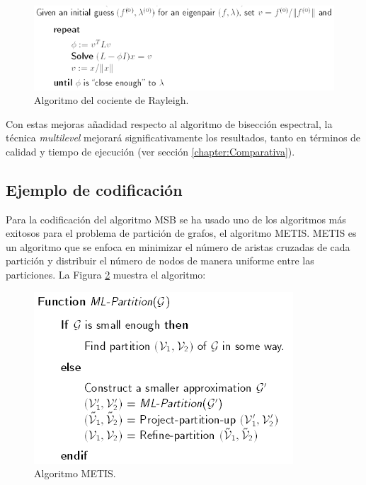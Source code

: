 \vspace{-4mm}
\begin{figure}[h]
	\centering
	\includegraphics[scale=0.8]{Figures/rayleigh}
	\vspace{2mm}
	\caption{Algoritmo del cociente de Rayleigh.}
	\label{rayleigh}
\end{figure}

\newpage
Con estas mejoras añadidad respecto al algoritmo de bisección espectral, la técnica \textit{multilevel} mejorará significativamente los resultados, tanto en términos de calidad y tiempo de ejecución (ver sección \ref{chapter:Comparativa}).

\subsection{Ejemplo de codificación}

Para la codificación del algoritmo MSB se ha usado uno de los algoritmos más exitosos para el problema de partición de grafos, el algoritmo METIS\cite{MeTis}. METIS es un algoritmo que se enfoca en minimizar el número de aristas cruzadas de cada partición y distribuir el número de nodos de manera uniforme entre las particiones. La Figura \ref{metis} muestra el algoritmo:

\begin{figure}[h]
	\centering
	\includegraphics[scale=0.8]{Figures/metis}
	\vspace{3mm}
	\caption{Algoritmo METIS.}
	\vspace{2mm}
	\label{metis}
\end{figure}

